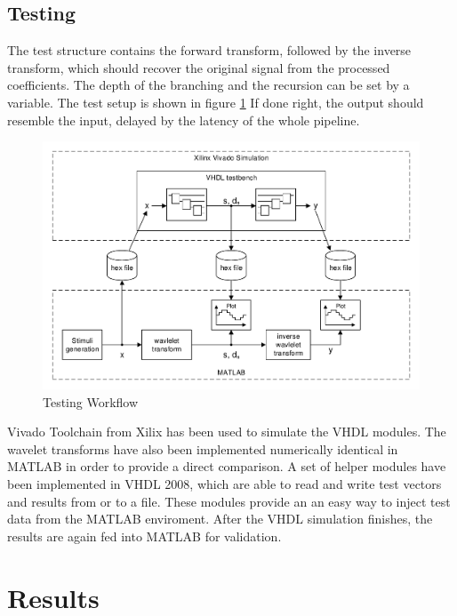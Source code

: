 \begin{refsection}



\subsection{Testing}

The test structure contains the forward transform, followed by the inverse transform, which should recover the original signal from the processed coefficients.
The depth of the branching and the recursion can be set by a variable. 
The test setup is shown in figure \ref{fpga:fig:testing}
If done right, the output should resemble the input, delayed by the latency of the whole pipeline.

\begin{figure}
	\centering
	\includegraphics[width=\textwidth]{papers/fpga/images/vhdl_sim.pdf}
	\caption{Testing Workflow \label{fpga:fig:testing}}
\end{figure}

Vivado Toolchain from Xilix has been used to simulate the VHDL modules.
The wavelet transforms have also been implemented numerically identical in MATLAB in order to provide a direct comparison. 
A set of helper modules have been implemented in VHDL 2008, which are able to read and write test vectors and results from or to a file.
These modules provide an an easy way to inject test data from the MATLAB enviroment.
After the VHDL simulation finishes, the results are again fed into MATLAB for validation.

\section{Results}


\end{refsection}

